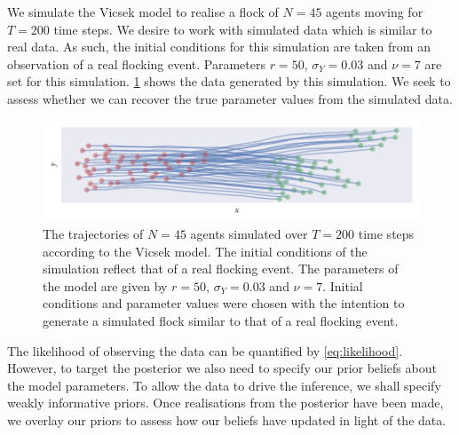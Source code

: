We simulate the Vicsek model to realise a flock of $N=45$ agents moving for
$T=200$ time steps. We desire to work with simulated data which is similar to
real data. As such, the initial conditions for this simulation are taken from
an observation of a real flocking event. Parameters $r=50$, $\sigma_Y=0.03$ and
$\nu=7$ are set for this simulation. \cref{fig:vicsek_sim} shows the data
generated by this simulation. We seek to assess whether we can recover the true
parameter values from the simulated data.

\begin{figure}[tbp]
  \includegraphics{vicsek_sim.pdf}
  \caption{The trajectories of $N=45$ agents simulated over $T=200$ time steps
    according to the Vicsek model. The initial conditions of the simulation
    reflect that of a real flocking event. The parameters of the model are
    given by $r=50$, $\sigma_Y=0.03$ and $\nu=7$. Initial conditions and
    parameter values were chosen with the intention to generate a simulated flock
    similar to that of a real flocking event.}
  \label{fig:vicsek_sim}
\end{figure}

The likelihood of observing the data can be quantified by \cref{eq:likelihood}.
However, to target the posterior we also need to specify our prior beliefs
about the model parameters. To allow the data to drive the inference, we shall
specify weakly informative priors. Once realisations from the posterior have
been made, we overlay our priors to assess how our beliefs have updated in
light of the data.

